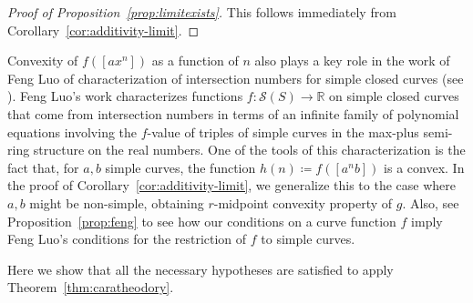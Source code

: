 \begin{proof}[Proof of Proposition~\ref{prop:limitexists}]
This follows immediately from Corollary~\ref{cor:additivity-limit}.
\end{proof}

\begin{remark}
Convexity of $f([ax^n])$ as a function of $n$ also plays a key role in the work of Feng Luo of characterization of intersection numbers for simple closed curves (see \cite[Corollary~4.4]{Luo98:IntersectionNumbers}).
Feng Luo's work characterizes functions $f \colon \mathcal{S}(S) \to \mathbb{R}$ on simple closed curves that come from intersection numbers in terms of an infinite family of polynomial equations involving the $f$-value of triples of simple curves in the max-plus semi-ring structure on the real numbers.
One of the tools of this characterization is the fact that, for $a,b$ simple curves, the function $h(n) \coloneqq f([a^n b])$ is a convex.
In the proof of Corollary~\ref{cor:additivity-limit}, we generalize this to the case where $a,b$ might be non-simple, obtaining  $r$-midpoint convexity property of $g$.
Also, see Proposition~\ref{prop:feng} to see how our conditions on a curve function $f$ imply Feng Luo's conditions for the restriction of $f$ to simple curves.
\end{remark}

 Here we show that all the necessary hypotheses are satisfied to apply
 Theorem~\ref{thm:caratheodory}.

